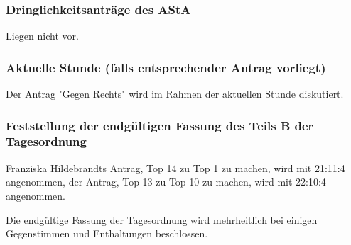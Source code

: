 \documentclass[ngerman,headheight=70pt]{scrartcl}
\begin{document}
    \subsubsection{Dringlichkeitsanträge des AStA}

    Liegen nicht vor.

    \subsubsection{Aktuelle Stunde (falls entsprechender Antrag vorliegt)}

    Der Antrag "Gegen Rechts" wird im Rahmen der aktuellen Stunde diskutiert.

    \subsubsection{Feststellung der endgültigen Fassung des Teils B der Tagesordnung}

    Franziska Hildebrandts Antrag, Top 14 zu Top 1 zu machen, wird mit 21:11:4
    angenommen, der Antrag, Top 13 zu Top 10 zu machen, wird mit 22:10:4 angenommen.

    Die endgültige Fassung der Tagesordnung wird mehrheitlich bei einigen
    Gegenstimmen und Enthaltungen beschlossen.
\end{document}
